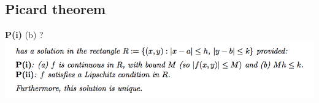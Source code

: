 \documentclass[12pt]{article}
\begin{document}
\subsection{Picard theorem}
\textbf{P(i)} (b) ?\\
\includegraphics[width=400pt]{img/question-differential-equations-a1-picard.png}\\
\end{document}
